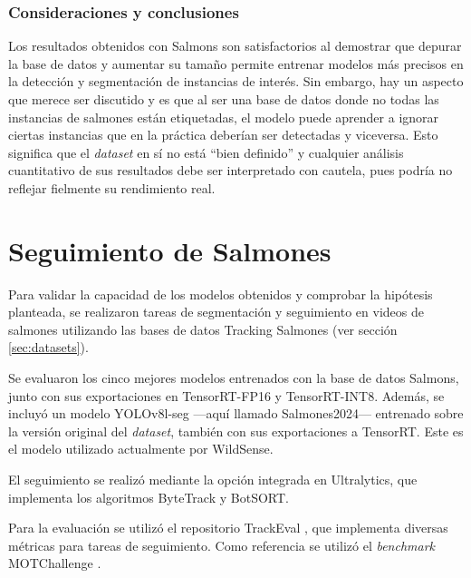 \subsubsection{Consideraciones y conclusiones}
Los resultados obtenidos con Salmons son satisfactorios al demostrar que depurar la base de datos y aumentar su tamaño permite entrenar modelos más precisos en la detección y segmentación de instancias de interés. Sin embargo, hay un aspecto que merece ser discutido y es que al ser una base de datos donde no todas las instancias de salmones están etiquetadas, el modelo puede aprender a ignorar ciertas instancias que en la práctica deberían ser detectadas y viceversa. Esto significa que el \textit{dataset} en sí no está ``bien definido'' y cualquier análisis cuantitativo de sus resultados debe ser interpretado con cautela, pues podría no reflejar fielmente su rendimiento real.



\section{Seguimiento de Salmones}
Para validar la capacidad de los modelos obtenidos y comprobar la hipótesis planteada, se realizaron tareas de segmentación y seguimiento en videos de salmones utilizando las bases de datos Tracking Salmones (ver sección \ref{sec:datasets}).

Se evaluaron los cinco mejores modelos entrenados con la base de datos Salmons, junto con sus exportaciones en TensorRT-FP16 y TensorRT-INT8. Además, se incluyó un modelo YOLOv8l-seg ---aquí llamado Salmones2024--- entrenado sobre la versión original del \textit{dataset}, también con sus exportaciones a TensorRT. Este es el modelo utilizado actualmente por WildSense.

El seguimiento se realizó mediante la opción integrada en Ultralytics, que implementa los algoritmos ByteTrack y BotSORT.

Para la evaluación se utilizó el repositorio TrackEval \cite{TrackEval}, que implementa diversas métricas para tareas de seguimiento. Como referencia se utilizó el \textit{benchmark} MOTChallenge \cite{MOTChallenge}. 

